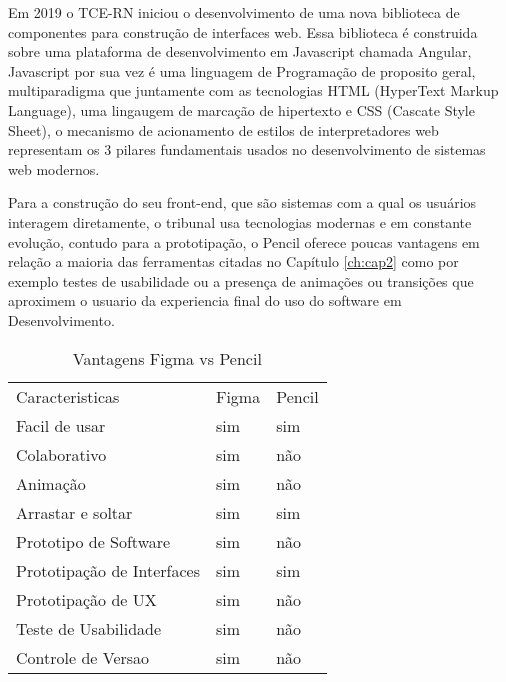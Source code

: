   Em 2019 o TCE-RN iniciou o desenvolvimento de uma nova biblioteca de componentes para construção de interfaces web. Essa biblioteca é construida sobre uma plataforma de desenvolvimento em Javascript chamada Angular, Javascript por sua vez é uma linguagem de Programação de proposito geral, multiparadigma que juntamente com as tecnologias HTML (HyperText Markup Language), uma lingaugem de marcação de hipertexto e CSS (Cascate Style Sheet), o mecanismo de acionamento de estilos de interpretadores web representam os 3 pilares fundamentais usados no desenvolvimento de sistemas web modernos.

  Para a construção do seu front-end, que são sistemas com a qual os usuários interagem diretamente, o tribunal usa tecnologias modernas e em constante evolução, contudo para a prototipação, o Pencil oferece poucas vantagens em relação a maioria das ferramentas citadas no Capítulo \ref{ch:cap2} como por exemplo testes de usabilidade ou a presença de animações ou transições que aproximem o usuario da experiencia final do uso do software em Desenvolvimento.

  \begin{table*}[!ht]
    \centering
    \caption{Vantagens Figma vs Pencil}
    \begin{tabular}{lll}
      
      \rowcolor[HTML]{AAAAAA}
      Caracteristicas             &
      Figma                       &
      Pencil                      \\
      \rowcolor[HTML]{DDDDDD}
      Facil de usar               &
      sim                         &
      sim                         \\
      Colaborativo                &
      sim                         &
      não                         \\
      \rowcolor[HTML]{DDDDDD}
      Animação                    &
      sim                         &
      não                         \\
      Arrastar e soltar           &
      sim                         &
      sim                         \\
      \rowcolor[HTML]{DDDDDD}
      Prototipo de Software       &
      sim                         &
      não                         \\
      Prototipação de Interfaces  &
      sim                         &
      sim                         \\
      \rowcolor[HTML]{DDDDDD}
      Prototipação de UX          &
      sim                         &
      não                         \\
      Teste de Usabilidade        &
      sim                         &
      não                         \\
      \rowcolor[HTML]{DDDDDD}
      Controle de Versao          &
      sim                         &
      não                         \\
    \end{tabular}
    \label{table-figma_vs_pencil}
  \end{table*}

